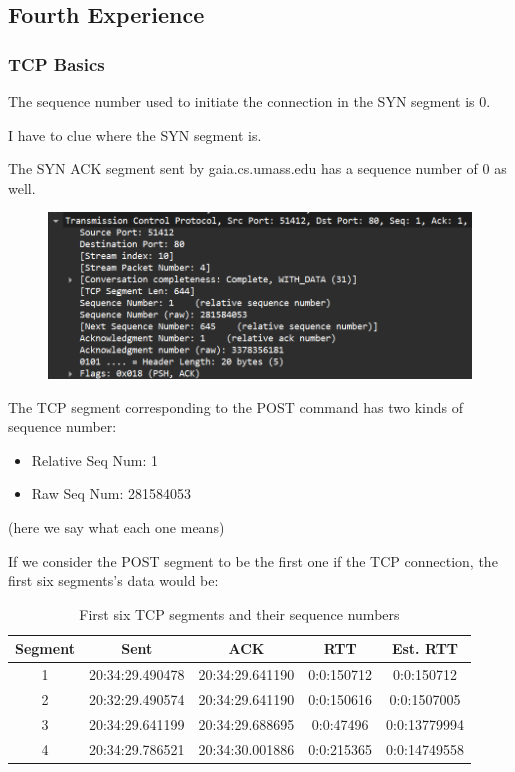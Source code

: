 \subsection{Fourth Experience}

\subsubsection{TCP Basics}

The sequence number used to initiate the connection in the SYN segment is 0.

I have to clue where the SYN segment is.

The SYN ACK segment sent by gaia.cs.umass.edu has a sequence number of 0 as
well.

\begin{figure}[htbp]
	\centering
	\includegraphics[width=1\linewidth]{img/fourth_experience/1.png}
	\caption{}\label{fig:4_1}
\end{figure}

The TCP segment corresponding to the POST command has two kinds of sequence
number:

\begin{itemize}
	\item Relative Seq Num: 1
	\item Raw Seq Num: 281584053
\end{itemize}

(here we say what each one means)

If we consider the POST segment to be the first one if the TCP connection, the
first six segments's data would be:

\begin{table}[htbp]
	\centering
	\begin{tabular}{|c|c|c|c|c|}
		\hline
		Segment & Sent            & ACK             & RTT        & Est. RTT     \\
		\hline
		1       & 20:34:29.490478 & 20:34:29.641190 & 0:0:150712 & 0:0:150712   \\
		2       & 20:32:29.490574 & 20:34:29.641190 & 0:0:150616 & 0:0:1507005  \\
		3       & 20:34:29.641199 & 20:34:29.688695 & 0:0:47496  & 0:0:13779994 \\
		4       & 20:34:29.786521 & 20:34:30.001886 & 0:0:215365 & 0:0:14749558 \\
		\hline
	\end{tabular}
	\caption{First six TCP segments and their sequence numbers}
	\label{tab:tcp_segments}
\end{table}

